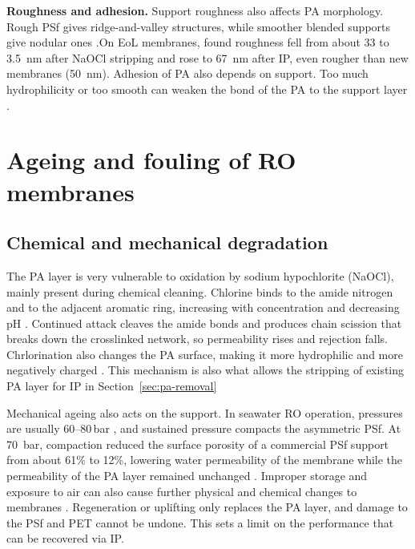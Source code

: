 \textbf{Roughness and adhesion.}
Support roughness also affects PA morphology. Rough PSf gives ridge-and-valley structures, while smoother blended supports give nodular ones \citep{GhoshHoek2009}.On EoL membranes, \citet{Ogbe2025} found roughness fell from about \qty{33}{} to \qty{3.5}{\nano\metre} after NaOCl stripping and rose to \qty{67}{\nano\metre} after IP, even rougher than new membranes (\qty{50}{\nano\metre}). Adhesion of PA also depends on support. Too much hydrophilicity or too smooth can weaken the bond of the PA to the support layer \citep{Ismail2015}.

\section{Ageing and fouling of RO membranes}
\label{sec:degradation}

\subsection{Chemical and mechanical degradation}

The PA layer is very vulnerable to oxidation by sodium hypochlorite (NaOCl), mainly present during chemical cleaning. Chlorine binds to the amide nitrogen and to the adjacent aromatic ring, increasing with concentration and decreasing pH \citep{Kwon2006a}. Continued attack cleaves the amide bonds and produces chain scission that breaks down the crosslinked network, so permeability rises and rejection falls\citep{Ogbe2025}. Chrlorination also changes the PA surface, making it more hydrophilic and more negatively charged \citep{Kwon2006a}. This mechanism is also what allows the stripping of existing PA layer for IP in Section~\ref{sec:pa-removal}

Mechanical ageing also acts on the support. In seawater RO operation, pressures are usually 60--80\,bar \citep{Greenlee2009}, and sustained pressure compacts the asymmetric PSf. At \qty{70}{bar}, compaction reduced the surface porosity of a commercial PSf support from about 61\% to 12\%, lowering water permeability of the membrane while the permeability of the PA layer remained unchanged \citep{Davenport2020}. Improper storage and exposure to air can also cause further physical and chemical changes to membranes \citep{Ogbe2025}. Regeneration or uplifting only replaces the PA layer, and damage to the PSf and PET cannot be undone. This sets a limit on the performance that can be recovered via IP.


